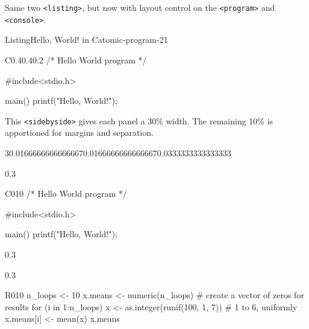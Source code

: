 \documentclass{amsart}
\theoremstyle{plain}%
\theoremstyle{definition}%
\theoremstyle{remark}%
\newcommand{\mono}[1]{\texttt{#1}}
\numberwithin{equation}{section}
\newcommand{\consoleinput}[1]{\textbf{#1}}
\begin{document}
Same two \mono{<listing>}, but now with layout control on the \mono{<program>} and \mono{<console>}.%
\begin{listingptx}{Listing}{Hello, World! in C}{atomic-program-21}{}%
\begin{program}{C}{0.4}{0.4}{0.2}
/* Hello World program */

#include<stdio.h>

main()
{
    printf("Hello, World!");
}
\end{program}
\tcblower
\end{listingptx}%
%
This \mono{<sidebyside>} gives each panel a 30\% width.  The remaining 10\% is apportioned for margins and separation.%
\begin{sidebyside}{3}{0.0166666666666667}{0.0166666666666667}{0.0333333333333333}%
\begin{sbspanel}{0.3}%
\begin{program}{C}{0}{1}{0}
/* Hello World program */

#include<stdio.h>

main()
{
    printf("Hello, World!");
}
\end{program}
\end{sbspanel}%
\begin{sbspanel}{0.3}%
\end{sbspanel}%
\begin{sbspanel}{0.3}%
\begin{program}{R}{0}{1}{0}
n_loops <- 10
x.means <- numeric(n_loops)  # create a vector of zeros for results
for (i in 1:n_loops){
    x <- as.integer(runif(100, 1, 7))  # 1 to 6, uniformly
    x.means[i] <- mean(x)
}
x.means
\end{program}
\end{sbspanel}%
\end{sidebyside}%
\end{document}

